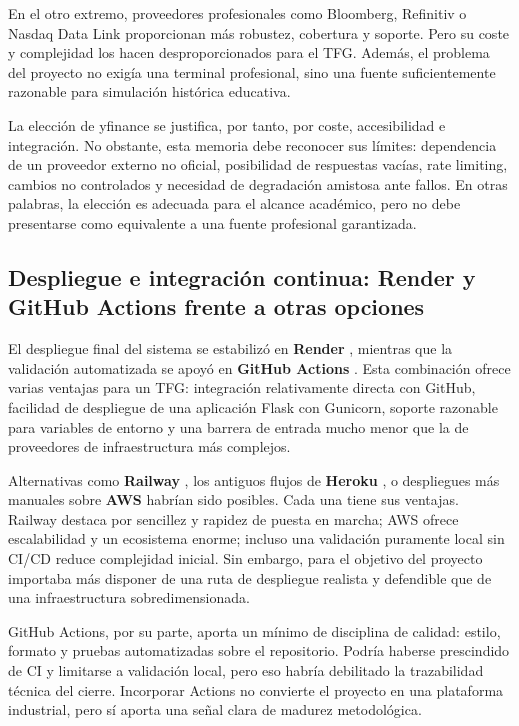 En el otro extremo, proveedores profesionales como Bloomberg, Refinitiv o Nasdaq Data Link \cite{bloomberg,refinitiv,nasdaq_data_link} proporcionan más robustez, cobertura y soporte. Pero su coste y complejidad los hacen desproporcionados para el TFG. Además, el problema del proyecto no exigía una terminal profesional, sino una fuente suficientemente razonable para simulación histórica educativa.

La elección de yfinance se justifica, por tanto, por coste, accesibilidad e integración. No obstante, esta memoria debe reconocer sus límites: dependencia de un proveedor externo no oficial, posibilidad de respuestas vacías, rate limiting, cambios no controlados y necesidad de degradación amistosa ante fallos. En otras palabras, la elección es adecuada para el alcance académico, pero no debe presentarse como equivalente a una fuente profesional garantizada.

\subsection{Despliegue e integración continua: Render y GitHub Actions frente a otras opciones}

El despliegue final del sistema se estabilizó en \textbf{Render} \cite{render}, mientras que la validación automatizada se apoyó en \textbf{GitHub Actions} \cite{github_actions}. Esta combinación ofrece varias ventajas para un TFG: integración relativamente directa con GitHub, facilidad de despliegue de una aplicación Flask con Gunicorn, soporte razonable para variables de entorno y una barrera de entrada mucho menor que la de proveedores de infraestructura más complejos.

Alternativas como \textbf{Railway} \cite{railway}, los antiguos flujos de \textbf{Heroku} \cite{heroku}, o despliegues más manuales sobre \textbf{AWS} \cite{aws} habrían sido posibles. Cada una tiene sus ventajas. Railway destaca por sencillez y rapidez de puesta en marcha; AWS ofrece escalabilidad y un ecosistema enorme; incluso una validación puramente local sin CI/CD reduce complejidad inicial. Sin embargo, para el objetivo del proyecto importaba más disponer de una ruta de despliegue realista y defendible que de una infraestructura sobredimensionada.

GitHub Actions, por su parte, aporta un mínimo de disciplina de calidad: estilo, formato y pruebas automatizadas sobre el repositorio. Podría haberse prescindido de CI y limitarse a validación local, pero eso habría debilitado la trazabilidad técnica del cierre. Incorporar Actions no convierte el proyecto en una plataforma industrial, pero sí aporta una señal clara de madurez metodológica.

